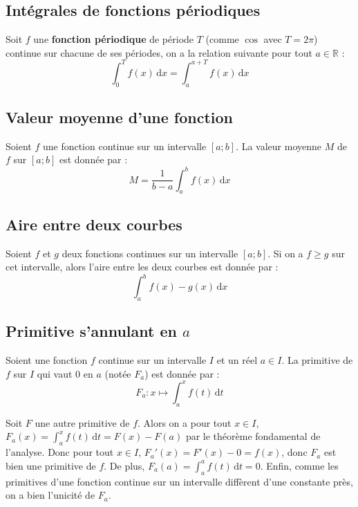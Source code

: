 	\subsection{Intégrales de fonctions périodiques}

	\begin{formula}
		Soit $f$ une \textbf{fonction périodique} de période $T$ (comme $\cos$ avec $T = 2\pi$) continue sur chacune de ses périodes, on a la relation suivante pour tout $a \in \mathbb{R}$ :
		\[ \int_{0}^{T} f(x) \, \mathrm{d}x = \int_{a}^{a + T} f(x) \, \mathrm{d}x \]
	\end{formula}

	\subsection{Valeur moyenne d'une fonction}

	\begin{formula}
		Soient $f$ une fonction continue sur un intervalle $[a;b]$. La valeur moyenne $M$ de $f$ sur $[a;b]$ est donnée par :
		\[ M = \frac{1}{b-a}\int_{a}^{b} f(x) \, \mathrm{d}x \]
	\end{formula}

	\subsection{Aire entre deux courbes}

	\begin{formula}
		Soient $f$ et $g$ deux fonctions continues sur un intervalle $[a;b]$. Si on a $f \geq g$ sur cet intervalle, alors l'aire entre les deux courbes est donnée par :
		\[ \int_{a}^{b} f(x) - g(x) \, \mathrm{d}x \]
	\end{formula}

	\subsection{Primitive s'annulant en \texorpdfstring{$a$}{a}}

	\begin{formula}
		Soient une fonction $f$ continue sur un intervalle $I$ et un réel $a \in I$. La primitive de $f$ sur $I$ qui vaut $0$ en $a$ (notée $F_a$) est donnée par :
		\[ F_a : x \mapsto \int_{a}^{x} f(t) \, \mathrm{d}t \]
	\end{formula}

	\begin{demonstration}
		Soit $F$ une autre primitive de $f$. Alors on a pour tout $x \in I$, $F_a(x) = \int_a^x f(t) \, \mathrm{d}t = F(x) - F(a)$ par le théorème fondamental de l'analyse.
		\newpar
		Donc pour tout $x \in I$, $F_a'(x) = F'(x) - 0 = f(x)$, donc $F_a$ est bien une primitive de $f$.
		\newpar
		De plus, $F_a(a) = \int_{a}^{a} f(t) \, \mathrm{d}t = 0$.
		\newpar
		Enfin, comme les primitives d'une fonction continue sur un intervalle diffèrent d'une constante près, on a bien l'unicité de $F_a$.
	\end{demonstration}

